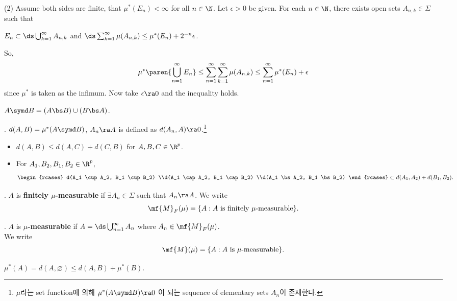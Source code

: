 (2) Assume both sides are finite, that \(\mu^\ast(E_n) < \infty\) for all \(n\in \N\). Let \(\epsilon > 0\) be given. For each \(n \in \N\), there exists open sets \(A_{n, k} \in \Sigma\) such that
\begin{center}
    \(E_n \subset \ds \bigcup_{k=1}^\infty A_{n, k}\) \quad and \quad \(\ds \sum_{k=1}^\infty \mu(A_{n,k}) \leq \mu^\ast(E_n) + 2^{-n}\epsilon\).
\end{center}
So,
\[
    \mu^\ast\paren{\bigcup_{n=1}^\infty E_n} \leq \sum_{n=1}^\infty \sum_{k=1}^\infty \mu(A_{n,k}) \leq \sum_{n=1}^\infty \mu^\ast(E_n) + \epsilon
\]
since \(\mu^\ast\) is taken as the infimum. Now take \(\epsilon \ra 0\) and the inequality holds.

\bigskip

\notation {} \(A \symd B = (A\bs B) \cup (B \bs A)\).

. \(d(A, B) = \mu^\ast(A \symd B)\), \(A_n \ra A\) is defined as \(d(A_n, A) \ra 0\).\footnote{\(\mu\)라는 set function에 의해 \(\mu^\ast (A \symd B) \ra 0\) 이 되는 sequence of elementary sets \(A_n\)이 존재한다.}

\rmk
\begin{itemize}
    \item \(d(A, B) \leq d(A, C) + d(C, B)\) for \(A, B, C \in \R^p\).
    \item For \(A_1, B_2, B_1, B_2 \in \R^p\),
          \[
              \begin{rcases}
                  d(A_1 \cup A_2, B_1 \cup B_2) \\d(A_1 \cap A_2, B_1 \cap B_2) \\d(A_1 \bs A_2, B_1 \bs B_2)
              \end{rcases} \subset d(A_1, A_2) + d(B_1, B_2).
          \]
\end{itemize}


.  \(A\) is \textbf{finitely \(\mu\)-measurable} if \(\exists A_n \in \Sigma\) such that \(A_n \ra A\). We write
\[
    \mf{M}_F(\mu) = \{A : A \text{ is finitely } \mu \text{-measurable}\}.
\]

.  \(A\) is \textbf{\(\mu\)-measurable} if \(A = \ds \bigcup_{n=1}^\infty A_n\) where \(A_n \in \mf{M}_F(\mu)\).\\
We write
\[
    \mf{M}(\mu) = \{A : A \text{ is } \mu \text{-measurable}\}.
\]

\rmk \(\mu^\ast(A) = d(A, \varnothing) \leq d(A, B) + \mu^\ast(B)\).

